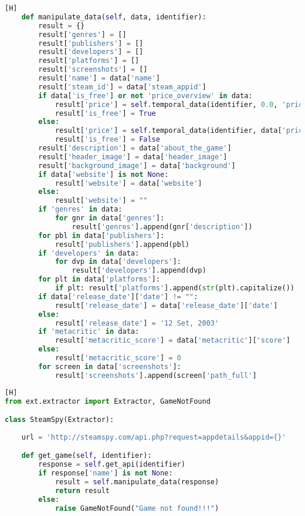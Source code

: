 \begin{anexosenv}
\begin{lstlisting}[language={Python}, caption = {Código do \textit{plugin} \textit{\textbf{Steam Store API}}}] [H]
	def manipulate_data(self, data, identifier):
		result = {}
		result['genres'] = []
		result['publishers'] = []
		result['developers'] = []
		result['platforms'] = []
		result['screenshots'] = []
		result['name'] = data['name']
		result['steam_id'] = data['steam_appid']
		if data['is_free'] or not 'price_overview' in data:
			result['price'] = self.temporal_data(identifier, 0.0, 'price')
			result['is_free'] = True
		else:
			result['price'] = self.temporal_data(identifier, data['price_overview']['initial'] / 100, 'price')
			result['is_free'] = False
		result['description'] = data['about_the_game']
		result['header_image'] = data['header_image']
		result['background_image'] = data['background']
		if data['website'] is not None:
			result['website'] = data['website']
		else:
			result['website'] = ""
		if 'genres' in data:
			for gnr in data['genres']:
				result['genres'].append(gnr['description'])
		for pbl in data['publishers']:
			result['publishers'].append(pbl)
		if 'developers' in data:
			for dvp in data['developers']:
				result['developers'].append(dvp)
		for plt in data['platforms']:
			if plt: result['platforms'].append(str(plt).capitalize())
		if data['release_date']['date'] != "":
			result['release_date'] = data['release_date']['date']
		else:
			result['release_date'] = '12 Set, 2003'
		if 'metacritic' in data:
			result['metacritic_score'] = data['metacritic']['score']
		else:
			result['metacritic_score'] = 0
		for screen in data['screenshots']:
			result['screenshots'].append(screen['path_full']
\end{lstlisting}
\begin{lstlisting}[language={Python}, caption = {Código do \textit{plugin} \textit{\textbf{Steam Spy API}}}] [H]
from ext.extractor import Extractor, GameNotFound

class SteamSpy(Extractor):
	
	url = 'http://steamspy.com/api.php?request=appdetails&appid={}'

	def get_game(self, identifier):
		response = self.get_api(identifier)
		if response['name'] is not None:
			result = self.manipulate_data(response)
			return result
		else:
			raise GameNotFound("Game not found!!!")


\end{lstlisting}
\end{anexosenv}
